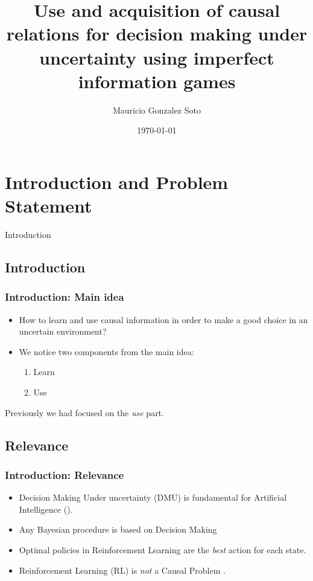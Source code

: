 \documentclass{beamer}
\title{Use and acquisition of causal relations for decision making under uncertainty using imperfect information games} %
\author{Mauricio Gonzalez Soto} %
\institute[INAOE] %
{
Instituto Nacional de Astrofísica Óptica y Electrónica \\ %
\medskip
\textit{mauricio@inaoep.mx} %
}
\date{\today} %
\theoremstyle{plain}
\begin{document}
\begin{frame}
\titlepage %
\end{frame}

\begin{frame}[allowframebreaks]
\tableofcontents
\end{frame}

\section{Introduction and Problem Statement}
\begin{frame}
\begin{center}
\LARGE{Introduction}
\end{center}
\end{frame}

\subsection{Introduction}
\begin{frame}
\frametitle{Introduction: Main idea}
\begin{itemize}
\item How to learn and use causal information in order to make a good choice in an uncertain environment?
\item We notice two components from the main idea:
	\begin{enumerate}
		\item Learn
		\item Use
	\end{enumerate}
\end{itemize}
Previously we had focused on the \textit{use} part.
\end{frame}

\subsection{Relevance}
\begin{frame}
\frametitle{Introduction: Relevance}
\begin{itemize}
\item Decision Making Under uncertainty (DMU) is fundamental for Artificial Intelligence (\cite{lake2017building}).
\item Any Bayesian procedure is based on Decision Making
\item Optimal policies in Reinforcement Learning are the \textit{best} action for each state.
\item Reinforcement Learning (RL) is \textit{not} a Causal Problem \citep{gonzalez2019reinforcement}.
\end{itemize}
\end{frame}
\end{document}
